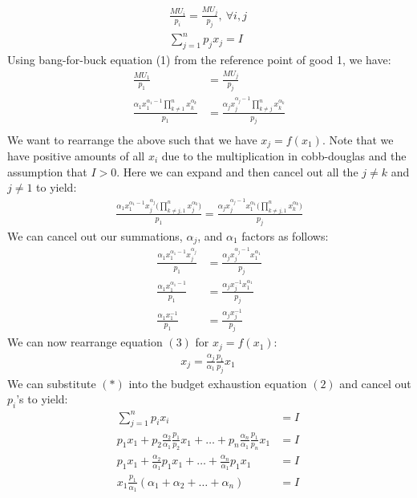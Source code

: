 \documentclass{article}
\begin{document}
  \begin{gather*}
    \frac{MU_{i}}{p_{i}} = \frac{MU_{j}}{p_{j}}, \ \forall i,j \ \tag{1} \\
    \sum_{j=1}^{n}p_{j}x_{j} = I \ \tag{2}
  \end{gather*}
  Using bang-for-buck equation (1) from the reference point of good 1, we have:
  \begin{align*}
    \frac{MU_{1}}{p_{1}} &= \frac{MU_{j}}{p_{j}} \\
    \frac{\alpha_{1}x_{1}^{\alpha_{1}-1} \prod_{k \neq 1}^{n} x_{k}^{\alpha_{k}}}{p_{1}} &= \frac{\alpha_{j}x_{j}^{\alpha_{j}-1} \prod_{k \neq j}^{n} x_{k}^{\alpha_{k}}}{p_{j}} \\
  \end{align*}
  We want to rearrange the above such that we have $x_{j} = f(x_{1})$. Note that we have positive amounts of all $x_{i}$ due to the multiplication in cobb-douglas and the assumption that $I > 0$. Here we can expand and then cancel out all the $j \neq k$ and $j \neq 1$ to yield:
  \begin{gather*}
    \frac{\alpha_{1}x_{1}^{\alpha_{1} - 1} x_{j}^{\alpha_{j}} \big( \prod_{k \neq j,1}^{n} x_{j}^{\alpha_{k}} \big) }{p_{1}} = \frac{\alpha_{j}x_{j}^{\alpha_{j}-1} x_{1}^{\alpha_{1}} \big( \prod_{k \neq j,1}^{n} x_{k}^{\alpha_{k}} \big)}{p_{j}}
  \end{gather*}
  We can cancel out our summations, $\alpha_{j}$, and $\alpha_{1}$ factors as follows:
  \begin{align*}
    \frac{\alpha_{1}x_{1}^{\alpha_{1} - 1} x_{j}^{\alpha_{j}}}{p_{1}} &= \frac{\alpha_{j}x_{j}^{\alpha_{j}-1} x_{1}^{\alpha_{1}}}{p_{j}} \\
    \frac{\alpha_{1}x_{1}^{\alpha_{1} - 1}}{p_{1}} &= \frac{\alpha_{j}x_{j}^{-1} x_{1}^{\alpha_{1}}}{p_{j}} \\
    \frac{\alpha_{1}x_{1}^{-1}}{p_{1}} &= \frac{\alpha_{j}x_{j}^{-1}}{p_{j}} \ \tag{3}
  \end{align*}
  We can now rearrange equation $(3)$ for $x_{j} = f(x_{1})$:
  \begin{gather*}
    x_{j} = \frac{\alpha_{j}}{\alpha_{1}}\frac{p_{1}}{p_{j}}x_{1} \ \tag{*}
  \end{gather*}
  We can substitute $(*)$ into the budget exhaustion equation $(2)$ and cancel out $p_{i}$'s to yield:
  \begin{align*}
    \sum_{j=1}^{n}p_{i}x_{i} &= I \\
    p_{1}x_{1} + p_{2}\frac{\alpha_{2}}{\alpha_{1}}\frac{p_{1}}{p_{2}}x_{1} + \dots + p_{n}\frac{\alpha_{n}}{\alpha_{1}}\frac{p_{1}}{p_{n}}x_{1} &= I \\
    p_{1}x_{1} + \frac{\alpha_{2}}{\alpha_{1}}p_{1}x_{1} + \dots + \frac{\alpha_{n}}{\alpha_{1}}p_{1}x_{1} &= I \\
    x_{1}\frac{p_{1}}{\alpha_{1}} (\alpha_{1} + \alpha_{2} + \dots + \alpha_{n}) &= I \ \tag{4}
  \end{align*}
\end{document}
